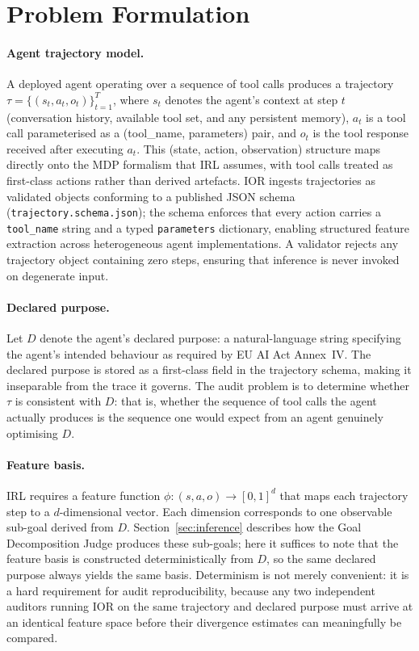 \section{Problem Formulation}
\label{sec:problem}

\paragraph{Agent trajectory model.}
A deployed agent operating over a sequence of tool calls produces a trajectory
$\tau = \{(s_t, a_t, o_t)\}_{t=1}^{T}$, where $s_t$ denotes the agent's context at
step $t$ (conversation history, available tool set, and any persistent memory),
$a_t$ is a tool call parameterised as a (tool\_name, parameters) pair, and $o_t$
is the tool response received after executing $a_t$. This (state, action,
observation) structure maps directly onto the MDP formalism that IRL assumes,
with tool calls treated as first-class actions rather than derived artefacts. IOR
ingests trajectories as validated objects conforming to a published JSON schema
(\texttt{trajectory.schema.json}); the schema enforces that every action carries
a \texttt{tool_name} string and a typed \texttt{parameters} dictionary, enabling
structured feature extraction across heterogeneous agent implementations. A
validator rejects any trajectory object containing zero steps, ensuring that
inference is never invoked on degenerate input.

\paragraph{Declared purpose.}
Let $D$ denote the agent's declared purpose: a natural-language string specifying
the agent's intended behaviour as required by EU AI Act Annex~IV. The declared
purpose is stored as a first-class field in the trajectory schema, making it
inseparable from the trace it governs. The audit problem is to determine whether
$\tau$ is consistent with $D$: that is, whether the sequence of tool calls the
agent actually produces is the sequence one would expect from an agent genuinely
optimising $D$.

\paragraph{Feature basis.}
IRL requires a feature function $\phi: (s, a, o) \to [0,1]^d$ that maps each
trajectory step to a $d$-dimensional vector. Each dimension corresponds to one
observable sub-goal derived from $D$. Section~\ref{sec:inference} describes how
the Goal Decomposition Judge produces these sub-goals; here it suffices to note
that the feature basis is constructed deterministically from $D$, so the same
declared purpose always yields the same basis. Determinism is not merely
convenient: it is a hard requirement for audit reproducibility, because any two
independent auditors running IOR on the same trajectory and declared purpose must
arrive at an identical feature space before their divergence estimates can
meaningfully be compared.


